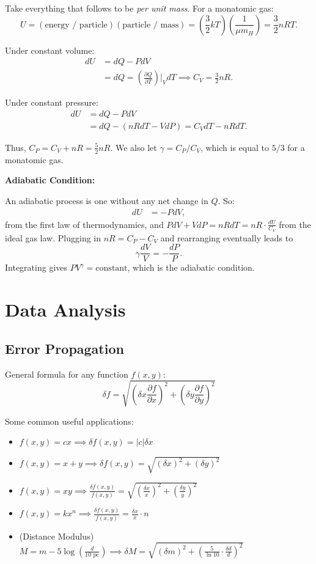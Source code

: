 \documentclass[12pt]{article}
\begin{document}
Take everything that follows to be \textit{per unit mass}. For a monatomic gas:
\[U = (\text{energy / particle})(\text{particle / mass}) = \left(\frac{3}{2}kT\right)\left(\frac{1}{\mu m_H}\right) = \frac{3}{2}nRT.\]

Under constant volume: 
\begin{align*}
dU &= dQ - PdV \\
&= dQ = \left(\frac{\partial Q}{\partial T}\right)\Biggr|_V dT \implies C_V = \frac{3}{2}nR.
\end{align*}

Under constant pressure: 
\begin{align*}
dU &= dQ - PdV \\
&= dQ - (nRdT - VdP) = C_VdT - nRdT.
\end{align*}

Thus, $C_P = C_V + nR = \frac{5}{2}nR$. We also let $\gamma = C_P/C_V$, which is equal to $5/3$ for a monatomic gas.

\textbf{Adiabatic Condition:}

An adiabatic process is one without any net change in $Q$. So: 
\begin{align*}
dU &= -PdV,
\end{align*}
from the first law of thermodynamics, and $PdV + VdP = nRdT = nR\cdot \frac{dU}{C_V}$ from the ideal gas law. Plugging in $nR = C_P - C_V$ and rearranging eventually leads to 
\[\gamma \frac{dV}{V} = -\frac{dP}{P}.\]
Integrating gives $PV^{\gamma} = \text{constant}$, which is the adiabatic condition. 

\newpage
\section{Data Analysis}

\subsection{Error Propagation}

General formula for any function $f(x,y)$: 
\[\delta f = \sqrt{\left(\delta x \frac{\partial f}{\partial x}\right)^2 + \left(\delta y \frac{\partial f}{\partial y}\right)^2}\]

Some common useful applications: 
\begin{itemize}
\item $f(x,y) = cx \implies \delta f(x,y) = \vert c\vert \delta x$
\item $f(x,y) = x+y \implies \delta f(x,y) = \sqrt{(\delta x)^2+(\delta y)^2}$
\item $f(x,y) = xy \implies \displaystyle \frac{\delta f(x,y)}{f(x,y)} = \sqrt{\left(\frac{\delta x}{x}\right)^2 + \left(\frac{\delta y}{y}\right)^2}$
\item $f(x,y) = kx^n \implies \displaystyle \frac{\delta f(x,y)}{f(x,y)} = \frac{\delta x}{x}\cdot n$
\item (Distance Modulus) \newline 
$\displaystyle M = m - 5\log{\left(\frac{d}{10\text{ pc}}\right)} \implies \delta M = \sqrt{(\delta m)^2 + \left(\frac{5}{\ln{10}}\cdot \frac{\delta d}{d}\right)^2}$
\end{itemize}
\end{document}

